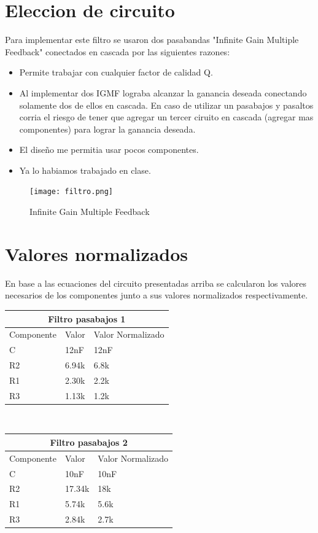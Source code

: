 \documentclass[11pt]{diazessay} %
\begin{document}
\section*{Eleccion de circuito}
Para implementar este filtro se usaron dos pasabandas "Infinite Gain Multiple Feedback" conectados en cascada por las siguientes razones: \\
\begin{itemize}
\item Permite trabajar con cualquier factor de calidad Q.\\
\item Al implementar dos IGMF lograba alcanzar la ganancia deseada conectando solamente dos de ellos en cascada. En caso de utilizar un pasabajos y pasaltos corria el riesgo de tener que agregar un tercer ciruito en cascada (agregar mas componentes) para lograr la ganancia deseada.\\
\item El diseño me permitia usar pocos componentes.\\
\item Ya lo habiamos trabajado en clase.
\end{itemize}
\begin{figure}[h]
\centering
	\texttt{[image: filtro.png]}
\caption{Infinite Gain Multiple Feedback}
\end{figure}

\newpage
\section*{Valores normalizados}
En base a las ecuaciones del circuito presentadas arriba se calcularon los valores necesarios de los componentes junto a sus valores
normalizados respectivamente.\\
\break
\begin{tabular}{ |p{2cm}||p{2cm}|p{6cm}|  }
 \hline
 \multicolumn{3}{|c|}{Filtro pasabajos 1} \\
 \hline
 Componente&Valor&Valor Normalizado\\
 \hline
 C  & 12nF & 12nF\\
 R2  & 6.94k & 6.8k\\
 R1  & 2.30k & 2.2k\\
 R3  & 1.13k & 1.2k\\
 \hline
\end{tabular}\\
\break
\break
\begin{tabular}{ |p{2cm}||p{2cm}|p{6cm}|  }
 \hline
 \multicolumn{3}{|c|}{Filtro pasabajos 2} \\
 \hline
 Componente&Valor&Valor Normalizado\\
 \hline
 C  & 10nF & 10nF\\
 R2  & 17.34k & 18k\\
 R1  & 5.74k & 5.6k\\
 R3  & 2.84k & 2.7k\\
 \hline
\end{tabular}
\end{document}
